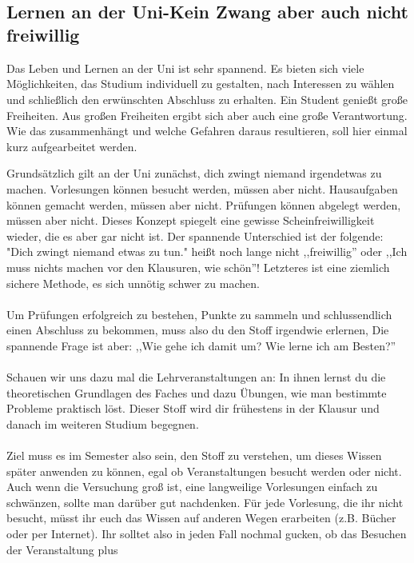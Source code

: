 \\ \\
\subsection{Lernen an der Uni-Kein Zwang aber auch nicht freiwillig}
	Das Leben und Lernen an der Uni ist sehr spannend. Es bieten sich viele Möglichkeiten, das Studium individuell zu gestalten, nach Interessen zu wählen und schließlich den erwünschten Abschluss zu erhalten. Ein Student genießt große Freiheiten. Aus großen Freiheiten ergibt sich aber auch eine große Verantwortung. Wie das zusammenhängt und welche Gefahren daraus resultieren, soll hier einmal kurz aufgearbeitet werden.
	
	Grundsätzlich gilt an der Uni zunächst, dich zwingt niemand irgendetwas zu machen. 
	Vorlesungen können besucht werden, müssen aber nicht. Hausaufgaben können gemacht werden, 
	müssen aber nicht. Prüfungen können abgelegt werden, müssen aber
	nicht.
	Dieses Konzept spiegelt eine gewisse Scheinfreiwilligkeit wieder, die es aber gar nicht ist. 
	Der spannende Unterschied ist der folgende: "Dich zwingt niemand etwas zu tun." heißt noch lange 
	nicht ,,freiwillig'' oder ,,Ich muss nichts machen vor den
	Klausuren, wie schön''! Letzteres ist eine ziemlich sichere
	Methode, es sich unnötig schwer zu machen.\\\\ 
	Um Prüfungen erfolgreich zu bestehen, Punkte zu sammeln und
	schlussendlich einen Abschluss zu bekommen, muss also du den Stoff
	irgendwie erlernen, Die spannende Frage ist aber: ,,Wie gehe ich
	damit um? Wie lerne ich am Besten?''\\\\	
	Schauen wir uns dazu mal die Lehrveranstaltungen an: In ihnen
	lernst du die theoretischen Grundlagen des Faches und dazu
	Übungen, wie man bestimmte Probleme praktisch löst. Dieser Stoff
	wird dir frühestens in der Klausur und danach im weiteren
	Studium begegnen.  \\\\	
	Ziel muss es im Semester also sein, den Stoff zu verstehen, um
	dieses Wissen später anwenden zu können, egal ob Veranstaltungen
	besucht werden oder nicht. Auch wenn die Versuchung groß ist,
	eine langweilige Vorlesungen einfach zu schwänzen, sollte man
	darüber gut nachdenken. Für jede Vorlesung, die ihr nicht
	besucht, müsst ihr euch das Wissen auf anderen Wegen erarbeiten
	(z.B. Bücher oder per Internet). Ihr solltet also in jeden Fall
	nochmal gucken, ob das Besuchen der Veranstaltung plus
